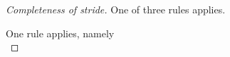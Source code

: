 \begin{proof}[Completeness of stride]
  {
  One of three rules applies.\\
   {
  }
   {
   }
  {
   }
  }

  {
  One rule applies, namely \\
  }


\end{proof}
